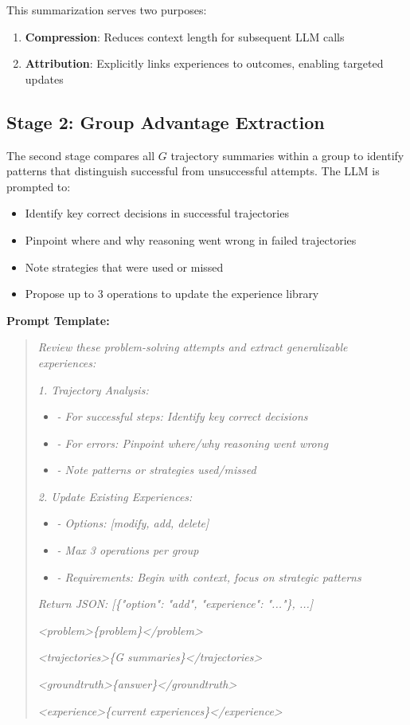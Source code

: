 \documentclass[11pt,a4paper]{article}
\begin{document}
This summarization serves two purposes:
\begin{enumerate}
    \item \textbf{Compression}: Reduces context length for subsequent LLM calls
    \item \textbf{Attribution}: Explicitly links experiences to outcomes, enabling targeted updates
\end{enumerate}

\subsection{Stage 2: Group Advantage Extraction}

The second stage compares all $G$ trajectory summaries within a group to identify patterns that distinguish successful from unsuccessful attempts. The LLM is prompted to:
\begin{itemize}
    \item Identify key correct decisions in successful trajectories
    \item Pinpoint where and why reasoning went wrong in failed trajectories
    \item Note strategies that were used or missed
    \item Propose up to 3 operations to update the experience library
\end{itemize}

\textbf{Prompt Template:}
\begin{quote}
\small
\textit{Review these problem-solving attempts and extract generalizable experiences:}

\textit{1. Trajectory Analysis:}
\begin{itemize}
    \item[] \textit{- For successful steps: Identify key correct decisions}
    \item[] \textit{- For errors: Pinpoint where/why reasoning went wrong}
    \item[] \textit{- Note patterns or strategies used/missed}
\end{itemize}

\textit{2. Update Existing Experiences:}
\begin{itemize}
    \item[] \textit{- Options: [modify, add, delete]}
    \item[] \textit{- Max 3 operations per group}
    \item[] \textit{- Requirements: Begin with context, focus on strategic patterns}
\end{itemize}

\textit{Return JSON: [\{"option": "add", "experience": "..."\}, ...]}

\textit{<problem>\{problem\}</problem>}

\textit{<trajectories>\{G summaries\}</trajectories>}

\textit{<groundtruth>\{answer\}</groundtruth>}

\textit{<experience>\{current experiences\}</experience>}
\end{quote}
\end{document}
